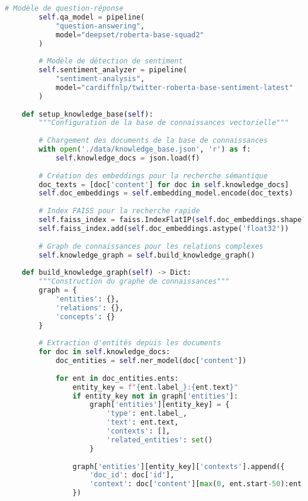 \documentclass[12pt,a4paper]{report}
\begin{document}
\begin{lstlisting}[language=Python, caption=Pipeline NLP avancé pour le chatbot]
        # Modèle de question-réponse
        self.qa_model = pipeline(
            "question-answering",
            model="deepset/roberta-base-squad2"
        )
        
        # Modèle de détection de sentiment
        self.sentiment_analyzer = pipeline(
            "sentiment-analysis",
            model="cardiffnlp/twitter-roberta-base-sentiment-latest"
        )
    
    def setup_knowledge_base(self):
        """Configuration de la base de connaissances vectorielle"""
        
        # Chargement des documents de la base de connaissances
        with open('./data/knowledge_base.json', 'r') as f:
            self.knowledge_docs = json.load(f)
        
        # Création des embeddings pour la recherche sémantique
        doc_texts = [doc['content'] for doc in self.knowledge_docs]
        self.doc_embeddings = self.embedding_model.encode(doc_texts)
        
        # Index FAISS pour la recherche rapide
        self.faiss_index = faiss.IndexFlatIP(self.doc_embeddings.shape[1])
        self.faiss_index.add(self.doc_embeddings.astype('float32'))
        
        # Graph de connaissances pour les relations complexes
        self.knowledge_graph = self.build_knowledge_graph()
    
    def build_knowledge_graph(self) -> Dict:
        """Construction du graphe de connaissances"""
        graph = {
            'entities': {},
            'relations': {},
            'concepts': {}
        }
        
        # Extraction d'entités depuis les documents
        for doc in self.knowledge_docs:
            doc_entities = self.ner_model(doc['content'])
            
            for ent in doc_entities.ents:
                entity_key = f"{ent.label_}:{ent.text}"
                if entity_key not in graph['entities']:
                    graph['entities'][entity_key] = {
                        'type': ent.label_,
                        'text': ent.text,
                        'contexts': [],
                        'related_entities': set()
                    }
                
                graph['entities'][entity_key]['contexts'].append({
                    'doc_id': doc['id'],
                    'context': doc['content'][max(0, ent.start-50):ent.end+50]
                })
        

\end{lstlisting}
\end{document}
